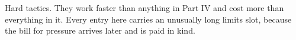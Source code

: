 
\begin{partblurb}
Hard tactics. They work faster than anything in Part IV and cost more than everything in it. Every entry here carries an unusually long limits slot, because the bill for pressure arrives later and is paid in kind.
\end{partblurb}
